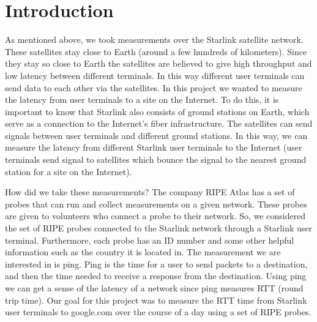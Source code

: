 \documentclass[acmsmall]{acmart}
\begin{document}
\section{Introduction}
As mentioned above, we took measurements over the Starlink satellite network. These satellites stay close to Earth (around a few hundreds of kilometers). Since they stay so close to Earth the satellites are believed to give high throughput and low latency between different terminals. In this way different user terminals can send data to each other via the satellites. In this project we wanted to measure the latency from user terminals to a site on the Internet. To do this, it is important to know that Starlink also consists of ground stations on Earth, which serve as a connection to the Internet's fiber infrastructure. The satellites can send signals between user terminals and different ground stations. In this way, we can measure the latency from different Starlink user terminals to the Internet (user terminals send signal to satellites which bounce the signal to the nearest ground station for a site on the Internet). 

How did we take these measurements? The company RIPE Atlas has a set of probes that can run and collect measurements on a given network. These probes are given to volunteers who connect a probe to their network. So, we considered the set of RIPE probes connected to the Starlink network through a Starlink user terminal. Furthermore, each probe has an ID number and some other helpful information such as the country it is located in. The measurement we are interested in is ping. Ping is the time for a user to send packets to a destination, and then the time needed to receive a response from the destination. Using ping we can get a sense of the latency of a network since ping measures RTT (round trip time). Our goal for this project was to measure the RTT time from Starlink user terminals to google.com over the course of a day using a set of RIPE probes.
\end{document}
